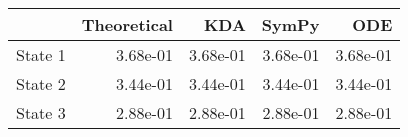 \begin{tabular}{lrrrr}
\toprule
{} &  Theoretical &      KDA &    SymPy &      ODE \\
\midrule
State 1 &     3.68e-01 & 3.68e-01 & 3.68e-01 & 3.68e-01 \\
State 2 &     3.44e-01 & 3.44e-01 & 3.44e-01 & 3.44e-01 \\
State 3 &     2.88e-01 & 2.88e-01 & 2.88e-01 & 2.88e-01 \\
\bottomrule
\end{tabular}

